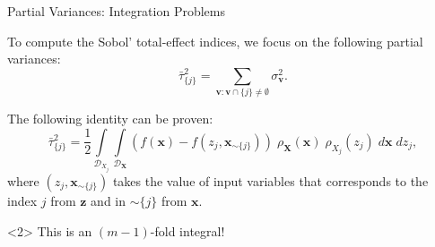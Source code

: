 \documentclass[english,aspectratio=169]{beamer}
\let\tempone\itemize
\let\temptwo\enditemize
\renewenvironment{itemize}{\tempone\addtolength{\itemsep}{0.35\baselineskip}}{\temptwo}
\begin{document}
\begin{frame}[fragile]{Partial Variances: Integration Problems}
\small

\begin{itemize}
  \item To compute the Sobol' total-effect indices, we focus on the following partial variances:
  \begin{equation*}
    \bar{\tau}_{\{ j \}}^2 = \sum_{\bm{v}: \bm{v} \cap \{ j \} \neq \emptyset} \sigma_{\bm{v}}^2.
  \end{equation*}

  \item The following identity can be proven:
  \begin{equation*}
    \bar{\tau}_{\{ j \}}^2 = \frac{1}{2} \int\limits_{\mathcal{D}_{X_j}} \int\limits_{\mathcal{D}_{\bm{X}}} \left( f(\bm{x}) - f(z_j, \bm{x}_{\sim \{j\}}) \right) \; \rho_{\bm{X}} (\bm{x}) \; \rho_{X_j} (z_j) \; d\bm{x} \; dz_j,
  \end{equation*}
  where $(z_j, \bm{x}_{\sim \{j\}})$ takes the value of input variables that corresponds
  to the index $j$ from $\bm{z}$ and in $\sim\{j\}$ from $\bm{x}$.
\end{itemize}

\begin{exampleblock}<2>{}
  \centering
  This is an $(m - 1)$-fold integral!
\end{exampleblock}

\end{frame}
\end{document}
